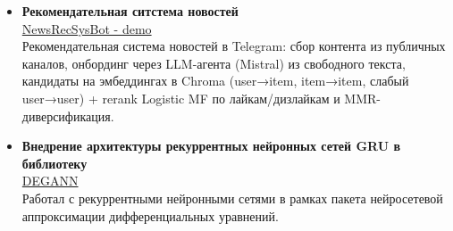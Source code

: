 \documentclass[a4paper,14pt]{article}
\begin{document}
\begin{itemize}

\item \textbf{Рекомендательная ситстема новостей} \\
\href{https://github.com/Denigmma/NewsRecSysBot}{NewsRecSysBot - demo}\\
Рекомендательная система новостей в Telegram: сбор контента из публичных каналов, онбординг через LLM-агента (Mistral) из свободного текста, кандидаты на эмбеддингах в Chroma (user→item, item→item, слабый user→user) + rerank Logistic MF по лайкам/дизлайкам и MMR-диверсификация.

\item \textbf{Внедрение архитектуры рекуррентных нейронных сетей GRU в библиотеку}\\ \href{https://github.com/Krekep/degann}{DEGANN}\\
    Работал с рекуррентными нейронными сетями в рамках пакета нейросетевой аппроксимации дифференциальных уравнений.



\end{itemize}
\end{document}
